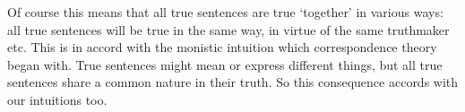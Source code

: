 Of course this means that all true sentences are true `together' in various ways: all true sentences will be true in the same way, in virtue of the same truthmaker etc.
This is in accord with the monistic intuition which correspondence theory began with.
True sentences might mean or express different things, but all true sentences share a common nature in their truth.
So this consequence accords with our intuitions too.
